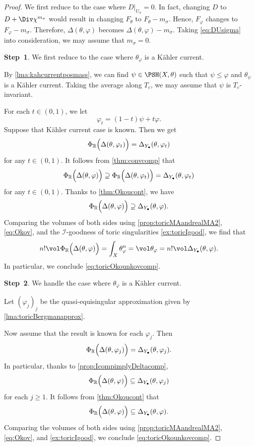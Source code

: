 \begin{proof}
     We first reduce to the case where $D|_{U_{\sigma}}=0$. In fact, changing $D$ to $D+\Div \chi^{m_{\sigma}}$ would result in changing $F_{\theta}$ to $F_{\theta}-m_{\sigma}$. Hence, $F_{\varphi}$ changes to $F_{\varphi}-m_{\sigma}$. Therefore, $\Delta(\theta,\varphi)$ becomes $\Delta(\theta,\varphi)-m_{\sigma}$. Taking \eqref{eq:DUsigma} into consideration, we may assume that $m_{\sigma}=0$.

    \textbf{Step~1}. We first reduce to the case where $\theta_{\varphi}$ is a Kähler current.

    By \cref{lma:kahcurrentposmass}, we can find $\psi\in \PSH(X,\theta)$ such that $\psi\leq \varphi$ and $\theta_{\psi}$ is a Kähler current. Taking the average along $T_c$, we may assume that $\psi$ is $T_c$-invariant.

    For each $t\in (0,1)$, we let
    \[
    \varphi_t=(1-t)\psi+t\varphi.
    \]
    Suppose that Kähler current case is known. Then we get
    \[
    \Phi_{\mathbb{R}}\Bigl(  \Delta(\theta,\varphi_t)\Bigr)=\Delta_{Y_{\bullet}}(\theta,\varphi_t)
    \]
    for any $t\in (0,1)$.
    It follows from \cref{thm:convcomp} that
    \[
    \Phi_{\mathbb{R}}\Bigl(  \Delta(\theta,\varphi)\Bigr)\supseteq \Phi_{\mathbb{R}}\Bigl(  \Delta(\theta,\varphi_t)\Bigr)= \Delta_{Y_{\bullet}}(\theta,\varphi_t)
    \]
    for any $t\in (0,1)$. Thanks to \cref{thm:Okoucont}, we have
    \[
    \Phi_{\mathbb{R}}\Bigl(  \Delta(\theta,\varphi)\Bigr)\supseteq \Delta_{Y_{\bullet}}(\theta,\varphi).
    \]
    Comparing the volumes of both sides using \cref{prop:toricMAandrealMA2}, \eqref{eq:Okov}, and the $\mathcal{I}$-goodness of toric singularities \cref{ex:toricIgood}, we find that
    \[
    n!\vol \Phi_{\mathbb{R}}\Bigl(  \Delta(\theta,\varphi)\Bigr)=\int_X \theta_{\varphi}^n=\vol \theta_{\varphi}=n!\vol \Delta_{Y_{\bullet}}(\theta,\varphi).
    \]
    In particular, we conclude \eqref{eq:toricOkounkovcomp}.

    \textbf{Step~2}. We handle the case where $\theta_{\varphi}$ is a Kähler current.

    Let $(\varphi_j)_j$ be the quasi-equisingular approximation given by \cref{lma:toricBergmanapprox}.

    Now assume that the result is known for each $\varphi_j$. Then
    \[
    \Phi_{\mathbb{R}}\Bigl(  \Delta(\theta,\varphi_j)\Bigr)=\Delta_{Y_{\bullet}}(\theta,\varphi_j).
    \]
    In particular, thanks to \cref{prop:IcompimplyDeltacomp},
    \[
    \Phi_{\mathbb{R}}\Bigl(  \Delta(\theta,\varphi)\Bigr)\subseteq \Delta_{Y_{\bullet}}(\theta,\varphi_j)
    \]
    for each $j\geq 1$. It follows from \cref{thm:Okoucont} that
    \[
    \Phi_{\mathbb{R}}\Bigl(  \Delta(\theta,\varphi)\Bigr)\subseteq \Delta_{Y_{\bullet}}(\theta,\varphi).
    \]
    Comparing the volumes of both sides using \cref{prop:toricMAandrealMA2}, \eqref{eq:Okov}, and \cref{ex:toricIgood}, we conclude \eqref{eq:toricOkounkovcomp}.


\end{proof}
